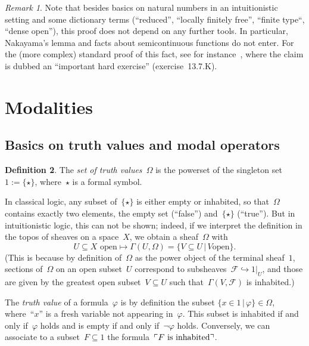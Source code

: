 \documentclass[10pt]{amsart}
\theoremstyle{definition}
\newtheorem{defn}{Definition}[section]
\theoremstyle{plain}
\theoremstyle{remark}
\newtheorem{rem}[defn]{Remark}
\newcommand{\F}{\mathcal{F}}
\newcommand{\?}{\,{:}\,}
\renewcommand{\_}{\mathpunct{.}\,}
\newcommand{\speak}[1]{\ulcorner\text{\textnormal{#1}}\urcorner}
\begin{document}
\begin{rem}Note that besides basics on natural numbers in an intuitionistic
setting and some dictionary terms (``reduced'', ``locally finitely free'',
``finite type``, ``dense open''), this proof does not depend on any further
tools. In particular, Nakayama's lemma and facts about semicontinuous functions
do not enter. For the (more complex) standard proof of this fact, see for
instance~\cite{vakil:foag}, where the claim is dubbed an ``important hard
exercise'' (exercise~13.7.K).\end{rem}


\section{Modalities}

\subsection{Basics on truth values and modal operators}

\begin{defn}The \emph{set of truth values~$\Omega$} is the powerset of the
singleton set~$1 := \{\star\}$, where~$\star$ is a formal symbol.\end{defn}

In classical logic, any subset of~$\{\star\}$ is either empty or inhabited, so
that~$\Omega$ contains exactly two elements, the empty set (``false'')
and~$\{\star\}$ (``true''). But
in intuitionistic logic, this can not be shown; indeed, if we interpret the
definition in the topos of sheaves on a space~$X$, we obtain a sheaf~$\Omega$
with
\[ \text{$U \subseteq X$ open} \longmapsto \Gamma(U,\Omega) = \{ V \subseteq U \,|\, \text{$V$
open} \}. \]
(This is because by definition of~$\Omega$ as the power object of the terminal
sheaf~$1$, sections of~$\Omega$ on an open subset~$U$ correspond to
subsheaves~$\F \hookrightarrow 1|_U$, and those are given by the greatest open
subset~$V \subseteq U$ such that~$\Gamma(V,\F)$ is inhabited.)

The \emph{truth value} of a formula~$\varphi$ is by definition the subset
$\{ x \in 1 \,|\, \varphi \} \in \Omega$, where~``$x$'' is a fresh variable not
appearing in~$\varphi$. This subset is inhabited if and only
if~$\varphi$ holds and is empty if and only if~$\neg\varphi$ holds.
Conversely, we can associate to a subset~$F \subseteq 1$ the
formula~$\speak{$F$ is inhabited}$.
\end{document}
